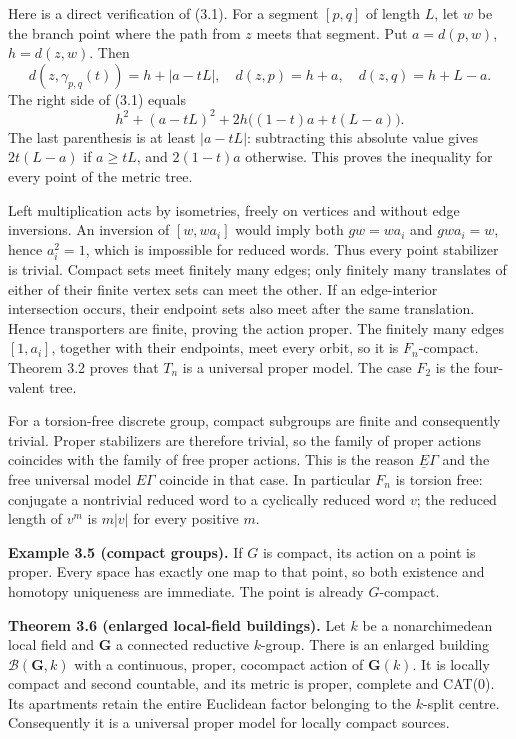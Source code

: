 \documentclass[
  11pt,
]{article}
\begin{document}
Here is a direct verification of (3.1). For a segment \([p,q]\) of
length \(L\), let \(w\) be the branch point where the path from \(z\)
meets that segment. Put \(a=d(p,w)\), \(h=d(z,w)\). Then \[
 d(z,\gamma_{p,q}(t))=h+|a-tL|,
 \quad d(z,p)=h+a,\quad d(z,q)=h+L-a.
\] The right side of (3.1) equals \[
 h^2+(a-tL)^2+2h\bigl((1-t)a+t(L-a)\bigr).
\] The last parenthesis is at least \(|a-tL|\): subtracting this
absolute value gives \(2t(L-a)\) if \(a\ge tL\), and \(2(1-t)a\)
otherwise. This proves the inequality for every point of the metric
tree.

Left multiplication acts by isometries, freely on vertices and without
edge inversions. An inversion of \([w,wa_i]\) would imply both
\(gw=wa_i\) and \(gwa_i=w\), hence \(a_i^2=1\), which is impossible for
reduced words. Thus every point stabilizer is trivial. Compact sets meet
finitely many edges; only finitely many translates of either of their
finite vertex sets can meet the other. If an edge-interior intersection
occurs, their endpoint sets also meet after the same translation. Hence
transporters are finite, proving the action proper. The finitely many
edges \([1,a_i]\), together with their endpoints, meet every orbit, so
it is \(F_n\)-compact. Theorem 3.2 proves that \(T_n\) is a universal
proper model. The case \(F_2\) is the four-valent tree.

For a torsion-free discrete group, compact subgroups are finite and
consequently trivial. Proper stabilizers are therefore trivial, so the
family of proper actions coincides with the family of free proper
actions. This is the reason \(\underline E\Gamma\) and the free
universal model \(E\Gamma\) coincide in that case. In particular \(F_n\)
is torsion free: conjugate a nontrivial reduced word to a cyclically
reduced word \(v\); the reduced length of \(v^m\) is \(m|v|\) for every
positive \(m\).

\textbf{Example 3.5 (compact groups).} If \(G\) is compact, its action
on a point is proper. Every space has exactly one map to that point, so
both existence and homotopy uniqueness are immediate. The point is
already \(G\)-compact.

\textbf{Theorem 3.6 (enlarged local-field buildings).} Let \(k\) be a
nonarchimedean local field and \(\mathbf G\) a connected reductive
\(k\)-group. There is an enlarged building \(\mathcal B(\mathbf G,k)\)
with a continuous, proper, cocompact action of \(\mathbf G(k)\). It is
locally compact and second countable, and its metric is proper, complete
and CAT(0). Its apartments retain the entire Euclidean factor belonging
to the \(k\)-split centre. Consequently it is a universal proper model
for locally compact sources.
\end{document}
